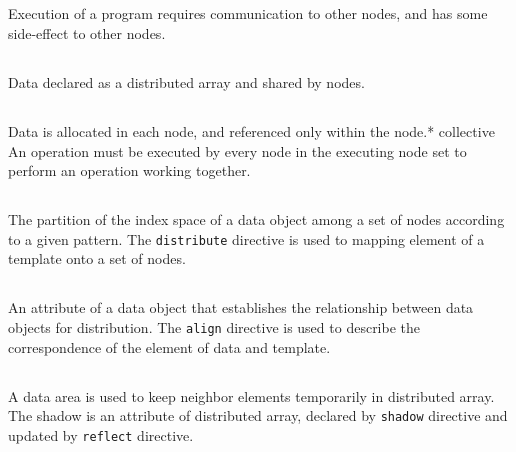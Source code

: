 \subsection*{}
Execution of a program requires
communication to other nodes, and has some side-effect to other
nodes. 

\subsection*{}
Data declared as a distributed array and shared by
nodes.

\subsection*{}
Data is allocated in each node, and referenced only
within the node.* collective  An operation must be executed by every
node in the executing node set to perform an operation working
together.

\subsection*{}
The partition of the index space of a data
object among a set of nodes according to a given pattern. The
{\tt distribute} directive is used to mapping element of a template onto a
set of nodes. 

\subsection*{}
An attribute of a data object that establishes
the relationship between data objects for distribution. The {\tt align}
directive is used to describe the correspondence of the element of data
and template. 

\subsection*{}
A data area is used to keep neighbor elements
temporarily in distributed array. The shadow is an attribute of
distributed array, declared by {\tt shadow} directive and updated by
{\tt reflect} directive.

